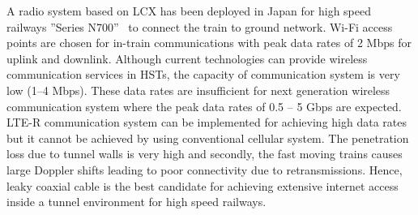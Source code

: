 A radio system based on LCX has been deployed in Japan for high speed railways ''Series N700''~\cite{takatsu2007history} to connect the train to ground network. Wi-Fi access points are chosen for in-train communications with peak data rates of 2 Mbps for uplink and downlink. Although current technologies can provide wireless communication services in HSTs, the capacity of communication system is very low (1--4 Mbps). These data rates are insufficient for next generation wireless communication system where the peak data rates of 0.5 -- 5 Gbps are expected. LTE-R communication system can be implemented for achieving high data rates but it cannot be achieved by using conventional cellular system. The penetration loss due to tunnel walls is very high and secondly, the fast moving trains causes large Doppler shifts leading to poor connectivity due to retransmissions. Hence, leaky coaxial cable is the best candidate for achieving extensive internet access inside a tunnel environment for high speed railways.



